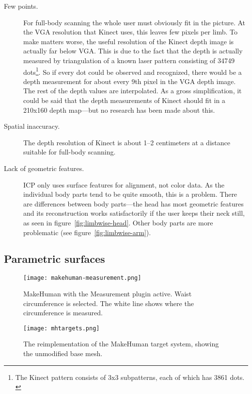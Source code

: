 \begin{description}
    \item[Few points.] For full-body scanning the whole user must obviously fit in the picture. At the VGA resolution that Kinect uses, this leaves few pixels per limb. To make matters worse, the useful resolution of the Kinect depth image is actually far below VGA. This is due to the fact that the depth is actually measured by triangulation of a known laser pattern consisting of 34749 dots\footnote{The Kinect pattern consists of 3x3 subpatterns, each of which has 3861 dots. \citep{reichinger2011}}. So if every dot could be observed and recognized, there would be a depth measurement for about every 9th pixel in the VGA depth image. The rest of the depth values are interpolated. As a gross simplification, it could be said that the depth measurements of Kinect should fit in a 210x160 depth map---but no research has been made about this.
    \item[Spatial inaccuracy.] The depth resolution of Kinect is about 1--2 centimeters at a distance suitable for full-body scanning.
    \item[Lack of geometric features.] ICP only uses surface features for alignment, not color data. As the individual body parts tend to be quite smooth, this is a problem. There are differences between body parts---the head has most geometric features and its reconstruction works satisfactorily if the user keeps their neck still, as seen in figure~\ref{fig:limbwise-head}. Other body parts are more problematic (see figure~\ref{fig:limbwise-arm}).
\end{description}

\subsection{Parametric surfaces}


\begin{figure}
    \centering
    \texttt{[image: makehuman-measurement.png]}
    \caption{MakeHuman with the Measurement plugin active. Waist circumference is selected. The white line shows where the circumference is measured.}
    \label{fig:makehuman-measurement}
\end{figure}

\begin{figure}
    \centering
    \texttt{[image: mhtargets.png]}
    \caption{The reimplementation of the MakeHuman target system, showing the unmodified base mesh.}
    \label{fig:mhtargets}
\end{figure}

